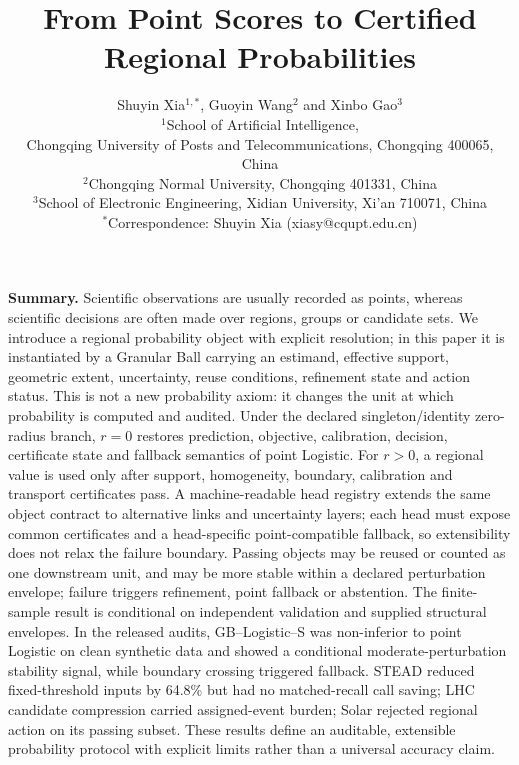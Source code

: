 \documentclass[10pt]{article}
\title{From Point Scores to Certified Regional Probabilities}
\author{Shuyin Xia$^{1,*}$, Guoyin Wang$^{2}$ and Xinbo Gao$^{3}$\\
$^{1}$School of Artificial Intelligence,\\
Chongqing University of Posts and Telecommunications, Chongqing 400065, China\\
$^{2}$Chongqing Normal University, Chongqing 401331, China\\
$^{3}$School of Electronic Engineering, Xidian University, Xi'an 710071, China\\
$^{*}$Correspondence: Shuyin Xia (xiasy@cqupt.edu.cn)}
\date{}
\begin{document}
\maketitle
\vspace{-0.4em}
\textbf{Summary.}
Scientific observations are usually recorded as points, whereas scientific decisions are often made over regions, groups or candidate sets. We introduce a regional probability object with explicit resolution; in this paper it is instantiated by a Granular Ball carrying an estimand, effective support, geometric extent, uncertainty, reuse conditions, refinement state and action status. This is not a new probability axiom: it changes the unit at which probability is computed and audited. Under the declared singleton/identity zero-radius branch, $r=0$ restores prediction, objective, calibration, decision, certificate state and fallback semantics of point Logistic. For $r>0$, a regional value is used only after support, homogeneity, boundary, calibration and transport certificates pass. A machine-readable head registry extends the same object contract to alternative links and uncertainty layers; each head must expose common certificates and a head-specific point-compatible fallback, so extensibility does not relax the failure boundary. Passing objects may be reused or counted as one downstream unit, and may be more stable within a declared perturbation envelope; failure triggers refinement, point fallback or abstention. The finite-sample result is conditional on independent validation and supplied structural envelopes. In the released audits, GB--Logistic--S was non-inferior to point Logistic on clean synthetic data and showed a conditional moderate-perturbation stability signal, while boundary crossing triggered fallback. STEAD reduced fixed-threshold inputs by 64.8\% but had no matched-recall call saving; LHC candidate compression carried assigned-event burden; Solar rejected regional action on its passing subset. These results define an auditable, extensible probability protocol with explicit limits rather than a universal accuracy claim.
\end{document}
